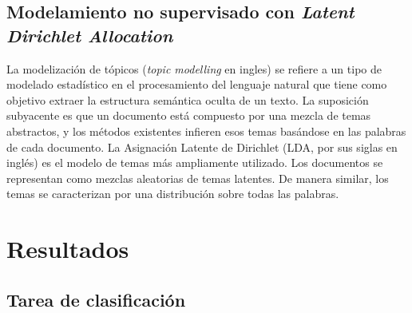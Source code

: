 \documentclass[
	spanish, %
	letterpaper, oneside
]{article}
\begin{document}
\subsection{Modelamiento no supervisado con \textit{Latent Dirichlet Allocation}}


La modelización de tópicos (\textit{topic modelling} en ingles) se refiere a un tipo de modelado estadístico en el procesamiento del lenguaje natural que tiene como objetivo extraer la estructura semántica oculta de un texto. La suposición subyacente es que un documento está compuesto por una mezcla de temas abstractos, y los métodos existentes infieren esos temas basándose en las palabras de cada documento. La Asignación Latente de Dirichlet (LDA, por sus siglas en inglés) es el modelo de temas más ampliamente utilizado. Los documentos se representan como mezclas aleatorias de temas latentes. De manera similar, los temas se caracterizan por una distribución sobre todas las palabras.




\section{Resultados}

\subsection{Tarea de clasificación}

\lipsum[7]
\end{document}
